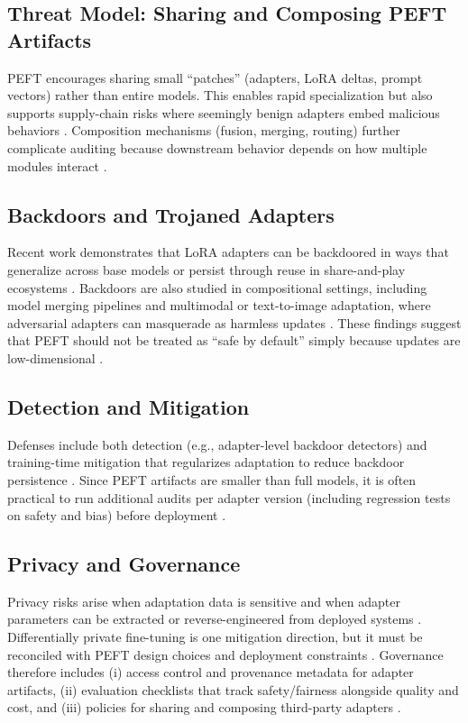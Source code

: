 \documentclass[conference]{IEEEtran}
\begin{document}
\subsection{Threat Model: Sharing and Composing PEFT Artifacts}
PEFT encourages sharing small ``patches'' (adapters, LoRA deltas, prompt vectors) rather than entire models. This enables rapid specialization but also supports supply-chain risks where seemingly benign adapters embed malicious behaviors \cite{liu2024loratk}. Composition mechanisms (fusion, merging, routing) further complicate auditing because downstream behavior depends on how multiple modules interact \cite{pfeiffer2020adapterfusion,yadav2023ties,yin2024lobam}.

\subsection{Backdoors and Trojaned Adapters}
Recent work demonstrates that LoRA adapters can be backdoored in ways that generalize across base models or persist through reuse in share-and-play ecosystems \cite{liu2024loratk,chen2025causal}. Backdoors are also studied in compositional settings, including model merging pipelines and multimodal or text-to-image adaptation, where adversarial adapters can masquerade as harmless updates \cite{yin2024lobam,lyu2026when}. These findings suggest that PEFT should not be treated as ``safe by default'' simply because updates are low-dimensional \cite{taraghi2025efficiency,liu2024loratk}.

\subsection{Detection and Mitigation}
Defenses include both detection (e.g., adapter-level backdoor detectors) and training-time mitigation that regularizes adaptation to reduce backdoor persistence \cite{sun2024peftguard,merenciano2026weight,luong2026why}. Since PEFT artifacts are smaller than full models, it is often practical to run additional audits per adapter version (including regression tests on safety and bias) before deployment \cite{sun2024peftguard,taraghi2025efficiency}.

\subsection{Privacy and Governance}
Privacy risks arise when adaptation data is sensitive and when adapter parameters can be extracted or reverse-engineered from deployed systems \cite{wang2025stolenlora}. Differentially private fine-tuning is one mitigation direction, but it must be reconciled with PEFT design choices and deployment constraints \cite{yu2021differentially,han2024parameter}. Governance therefore includes (i) access control and provenance metadata for adapter artifacts, (ii) evaluation checklists that track safety/fairness alongside quality and cost, and (iii) policies for sharing and composing third-party adapters \cite{pfeiffer2020adapterhub,taraghi2025efficiency}.
\end{document}
